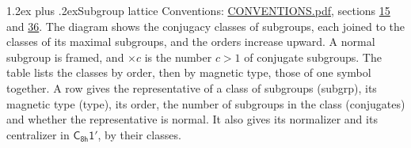 \documentclass[10pt,a4paper]{article}
\makeatletter
\renewcommand\section{\@startsection{section}{1}{\z@}{-3ex plus -1ex minus -.2ex}%
  {1.2ex plus .2ex}{\normalfont\large\sffamily\bfseries\color{parttitle}}}
\numberwithin{equation}{section}
\newcommand{\grp}[1]{\mathsf{#1}}
\makeatother
\begin{document}
\section{Subgroup lattice}\label{s:subgroups}
Conventions: \href{../../CONVENTIONS.pdf}{CONVENTIONS.pdf}, sections \href{../../../rotation/CONVENTIONS.pdf\#conv.15}{15} and \href{../../CONVENTIONS.pdf\#conv.36}{36}.
The diagram shows the conjugacy classes of subgroups, each joined to the classes of its maximal subgroups, and the orders increase upward. \label{n:index.conjugates.c}A normal subgroup is framed, and ${\times}c$ is the number $c > 1$ of conjugate subgroups. The table lists the classes by order, then by magnetic type, those of one symbol together. \label{n:head.subgroup}\label{n:head.magnetic.type}\label{n:head.order}\label{n:head.conjugates}\label{n:head.normal}A row gives the representative of a class of subgroups (subgrp), its magnetic type (type), its order, the number of subgroups in the class (conjugates) and whether the representative is normal. \label{n:head.normalizer}\label{n:head.centralizer}It also gives its normalizer and its centralizer in $\grp{C_{8h}1'}$, by their classes. 
\end{document}
